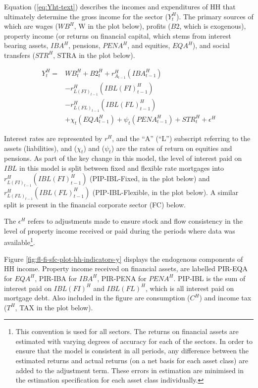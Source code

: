 \documentclass[
]{book}
\begin{document}
Equation (\ref{eq:Yht-text}) describes the incomes and expenditures of HH that ultimately determine the gross income for the sector (\(Y^H_t\)). The primary sources of which are wages (\(WB^H\), W in the plot below), profits (\(B2\), which is exogenous), property income (or returns on financial capital, which stems from interest bearing assets, \(IBA^H\), pensions, \(PENA^H\), and equities, \(EQA^H\)), and social transfers (\(STR^H\), STRA in the plot below).

\begin{equation}
\begin{split}
Y^H_t = & WB^H_t + B2^H_{t} + r^H_{A_{t-1}}(IBA^H_{t-1})\\
        & - r^H_{L(FI)_{t-1}}(IBL(FI)^H_{t-1})\\
        & - r^H_{L(FL)_{t-1}}(IBL(FL)^H_{t-1})\\
        & + \chi _t(EQA^H_{t-1}) + \psi _t(PENA^H_{t-1}) + STR^H_t + \epsilon ^H
\label{eq:Yht-text}
\end{split}
\end{equation}

Interest rates are represented by \(r^H\), and the ``A'' (``L'') subscript referring to the assets (liabilities), and (\(\chi _t\)) and (\(\psi _t\)) are the rates of return on equities and pensions. As part of the key change in this model, the level of interest paid on \(IBL\) in this model is split between fixed and flexible rate mortgages into \(r^H_{L(FI)_{t-1}}(IBL(FI)^H_{t-1})\) (PIP-IBL-Fixed, in the plot below) and \(r^H_{L(FL)_{t-1}}(IBL(FL)^H_{t-1})\) (PIP-IBL-Flexible, in the plot below). A similar split is present in the financial corporate sector (FC) below.

The \(\epsilon ^H\) refers to adjustments made to ensure stock and flow consistency in the level of property income received or paid during the periods where data was available\footnote{This convention is used for all sectors. The returns on financial assets are estimated with varying degrees of accuracy for each of the sectors. In order to ensure that the model is consistent in all periods, any difference between the estimated returns and actual returns (on a net basis for each asset class) are added to the adjustment term. These errors in estimation are minimised in the estimation specification for each asset class individually.}.

Figure \ref{fig:fl-fi-sfc-plot-hh-indicators-y} displays the endogenous components of HH income. Property income received on financial assets, are labelled PIR-EQA for \(EQA^H\), PIR-IBA for \(IBA^H\), PIR-PENA for \(PENA^H\). PIP-IBL is the sum of interest paid on \(IBL(FI)^H\) and \(IBL(FL)^H\), which is all interest paid on mortgage debt. Also included in the figure are consumption (\(C^H\)) and income tax (\(T^H\), TAX in the plot below).
\end{document}

